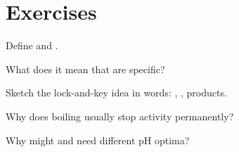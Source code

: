 \section{Exercises}

\begin{exercise}[$\star$]\label{exo:g8:enzymes:1}
Define  and .
\end{exercise}

\begin{exercise}[$\star$]\label{exo:g8:enzymes:2}
What does it mean that  are specific?
\end{exercise}

\begin{exercise}[$\star$]\label{exo:g8:enzymes:3}
Sketch the lock-and-key idea in words: , , products.
\end{exercise}

\begin{exercise}[$\star$]\label{exo:g8:enzymes:4}
Why does boiling usually stop  activity permanently?
\end{exercise}

\begin{exercise}[$\star$]\label{exo:g8:enzymes:5}
Why might  and   need different pH optima?
\end{exercise}

